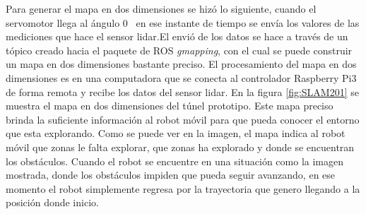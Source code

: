 Para generar el mapa en dos dimensiones se hizó lo siguiente, cuando el servomotor llega al ángulo
0\grad~ en ese instante de tiempo se envía los valores de las mediciones que hace el sensor lidar.El
envió de los datos se hace a través de un tópico creado hacia el paquete de ROS \textit{gmapping}, 
con el cual se puede construir un mapa en dos dimensiones bastante preciso. El procesamiento del 
mapa en dos dimensiones es en una computadora que se conecta al controlador Raspberry Pi3 de forma 
remota y recibe los datos del sensor lidar. En la figura \ref{fig:SLAM201} se muestra el mapa en 
dos dimensiones del túnel prototipo. Este mapa preciso brinda la suficiente información al robot  
móvil para que pueda conocer el entorno que esta explorando. Como se puede ver en la imagen, el 
mapa indica al robot móvil que zonas le falta explorar, que zonas ha explorado y donde se 
encuentran los obstáculos. Cuando el robot se encuentre en una situación como la imagen mostrada, 
donde los obstáculos impiden que pueda seguir avanzando, en ese momento el robot simplemente regresa 
por la trayectoria que genero llegando a la posición donde inicio.
 


